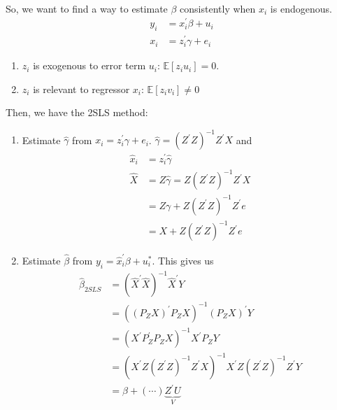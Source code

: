 \begin{eg}
    \

    So, we want to find a way to estimate $\beta$ consistently when $x_i$ is endogenous.
    \begin{align*}
        y_i &= x_i^{\prime} \beta + u_i \\
        x_i &= z_i^{\prime} \gamma + e_i
    \end{align*}

    \begin{enumerate}
        \item $z_i$ is exogenous to error term $u_i$: $\mathbb{E}[z_i u_i] = 0$.
        \item $z_i$ is relevant to regressor $x_i$: $\mathbb{E}[z_i v_i] \neq 0$
    \end{enumerate}

    Then, we have the 2SLS method:
    \begin{enumerate}
        \item Estimate $\hat{\gamma}$ from $x_i = z_i^{\prime} \gamma + e_i$. $\hat{\gamma} = (Z^{\prime} Z)^{-1}Z^{\prime} X$ and 
            \begin{align*}
                \hat{x}_i &= z_i^{\prime} \hat{\gamma} \\
                \hat{X} &= Z \hat{\gamma} = Z(Z^{\prime} Z)^{-1}Z^{\prime} X \\
                &= Z \gamma + Z(Z^{\prime} Z)^{-1}Z^{\prime} e \\
                &= X + Z(Z^{\prime} Z)^{-1}Z^{\prime} e
            \end{align*}
        \item Estimate $\hat{\beta}$ from $y_i = \hat{x}_i^{\prime} \beta + u_i^*$. This gives us 
            \begin{align*}
                \hat{\beta}_{2SLS} &= \left( \hat{X}^{\prime} \hat{X} \right)^{-1} \hat{X}^{\prime} Y \\
                &= \left((P_Z X)^{\prime} P_Z X\right)^{-1} (P_Z X)^{\prime} Y \\
                &= \left(X^{\prime} P_Z^{\prime} P_Z X\right)^{-1} X^{\prime} P_Z Y \\
                &= \left(X^{\prime} Z(Z^{\prime} Z)^{-1} Z^{\prime} X\right)^{-1} X^{\prime} Z (Z^{\prime} Z)^{-1} Z^{\prime} Y \\
                &= \beta + (\cdots) \underset{V}{\underbrace{Z^{\prime} U}}
            \end{align*}


\end{enumerate}
\end{eg}
